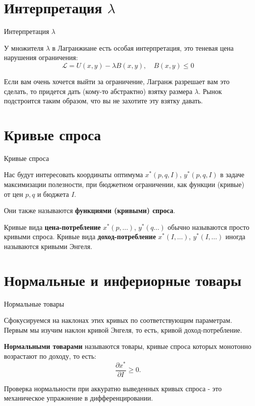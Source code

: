 \documentclass{beamer}
\begin{document}
\section{Интерпретация $\lambda$}

\begin{frame}{Интерпретация $\lambda$}

У множителя $\lambda$ в Лагранжиане есть особая интерпретация, это теневая цена нарушения ограничения:
$$\mathcal{L} = U(x,y) - \lambda B(x,y), \quad B(x,y) \leqslant 0$$ 

Если вам очень хочется выйти за ограничение, Лагранж разрешает вам это сделать, то придется дать (кому-то абстрактно) взятку размера $\lambda$. Рынок подстроится таким образом, что вы не захотите эту взятку давать. 

\end{frame}

\section{Кривые спроса}

\begin{frame}{Кривые спроса}

Нас будут интересовать координаты оптимума $x^{\ast}(p,q,I)$, $y^{\ast}(p,q,I)$ в задаче максимизации полезности, при бюджетном ограничении, как функции (кривые) от цен $p,q$ и бюджета $I$. 

Они также называются \textbf{функциями (кривыми) спроса}.

\begin{definition}
Кривые вида \textbf{цена-потребление} $x^{\ast}(p, \ldots)$, $y^{\ast}(q \ldots)$ обычно называются просто кривыми спроса. Кривые вида \textbf{доход-потребление} $x^{\ast}(I, \ldots)$, $y^{\ast}(I, \ldots)$ иногда называются кривыми Энгеля.
\end{definition}

\end{frame}

\section{Нормальные и инфериорные товары}

\begin{frame}{Нормальные товары}

Сфокусируемся на наклонах этих кривых по соответствующим параметрам. Первым мы изучим наклон кривой Энгеля, то есть, кривой доход-потребление.

\begin{definition}
\textbf{Нормальными товарами} называются товары, кривые спроса которых монотонно возрастают по доходу, то есть:
$$\frac{\partial x^{\ast}}{\partial I} \geqslant 0.$$
\end{definition}
Проверка нормальности при аккуратно выведенных кривых спроса - это механическое упражнение в дифференцировании.  

\end{frame}
\end{document}
